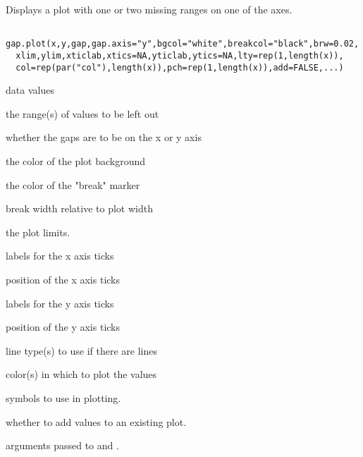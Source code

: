\begin{Description}\relax
Displays a plot with one or two missing ranges on one of the axes.
\end{Description}
\begin{Usage}
\begin{verbatim}
 gap.plot(x,y,gap,gap.axis="y",bgcol="white",breakcol="black",brw=0.02,
  xlim,ylim,xticlab,xtics=NA,yticlab,ytics=NA,lty=rep(1,length(x)),
  col=rep(par("col"),length(x)),pch=rep(1,length(x)),add=FALSE,...)
\end{verbatim}
\end{Usage}
\begin{Arguments}
\begin{ldescription}
\item[\code{x,y}] data values
\item[\code{gap}] the range(s) of values to be left out
\item[\code{gap.axis}] whether the gaps are to be on the x or y axis
\item[\code{bgcol}] the color of the plot background
\item[\code{breakcol}] the color of the "break" marker
\item[\code{brw}] break width relative to plot width
\item[\code{xlim,ylim}] the plot limits.
\item[\code{xticlab}] labels for the x axis ticks
\item[\code{xtics}] position of the x axis ticks
\item[\code{yticlab}] labels for the y axis ticks
\item[\code{ytics}] position of the y axis ticks
\item[\code{lty}] line type(s) to use if there are lines
\item[\code{col}] color(s) in which to plot the values
\item[\code{pch}] symbols to use in plotting.
\item[\code{add}] whether to add values to an existing plot.
\item[\code{...}] arguments passed to  and .
\end{ldescription}
\end{Arguments}
